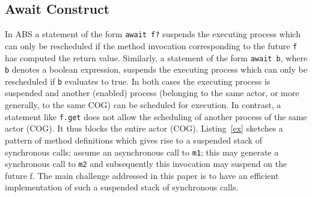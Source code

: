 





\subsection{Await Construct}
In ABS a statement of the form \texttt{await f?}
suspends the executing process which can only be rescheduled if the method
invocation corresponding to the future \texttt{f} has computed the return value.
Similarly, a statement of the form \texttt{await b}, where \texttt{b} denotes a boolean expression, suspends the executing process which can only be rescheduled if \texttt{b} evaluates to true. In both cases the executing process is suspended and another (enabled) process (belonging to the same actor, or more generally, to the same COG) can be scheduled for execution.
In contrast, a statement like \texttt{f.get} does not allow the scheduling of
another process of the same actor (COG). It thus blocks the entire actor (COG). Listing~\ref{ex} sketches a pattern of method definitions which gives rise to a suspended stack of synchronous calls; assume an asynchronous call to \texttt{m1}; this may generate a synchronous call to \texttt{m2} and subsequently this invocation may suspend on the future f. The main challenge addressed in this paper is to have an efficient implementation of such a suspended stack of synchronous calls.

